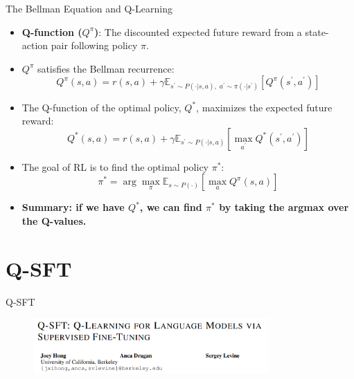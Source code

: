 \documentclass[aspectratio=169]{beamer}
\begin{document}
\begin{frame}{The Bellman Equation and Q-Learning}
  \begin{itemize}[<+->]
    \item \textbf{Q-function ($Q^\pi$)}: The discounted expected future reward from a state-action pair following policy $\pi$.
    \item $Q^\pi$ satisfies the Bellman recurrence:
    $$Q^\pi(s,a) = r(s,a) + \gamma\mathbb{E}_{s^{\prime}\sim P(\cdot|s,a), \; a^{\prime}\sim \pi(\cdot|s^{\prime})}\left[Q^\pi(s^{\prime},a^{\prime})\right]$$
    \item The Q-function of the optimal policy, $Q^*$, maximizes the expected future reward:
    $$Q^{*}(s,a) = r(s,a) + \gamma\mathbb{E}_{s^{\prime}\sim P(\cdot|s,a)}\left[\max_{a^{\prime}}Q^{*}(s^{\prime},a^{\prime})\right]$$


    \item The goal of RL is to find the optimal policy $\pi^*$:
    $$ \pi^* = \arg \max_{\pi} \mathbb{E}_{s\sim P(\cdot)}\left[\max_a Q^\pi(s,a)\right]$$

    \item \textbf{Summary: if we have $Q^*$, we can find $\pi^*$ by taking the argmax over the Q-values.}
  \end{itemize}
\end{frame}

\section{Q-SFT}

\begin{frame}{Q-SFT}
    \begin{figure}
        \includegraphics[width=0.8\textwidth]{img/Q-SFT head.png}
    \end{figure}
\end{frame}
\end{document}
